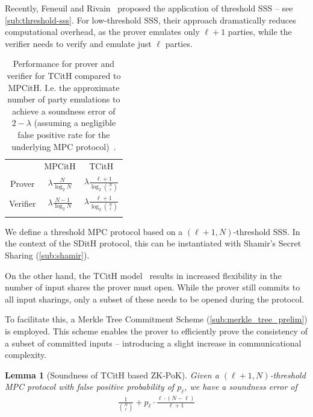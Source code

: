 \documentclass[11pt]{report}
\theoremstyle{definition}
\theoremstyle{plain}
\newtheorem{lemma}{Lemma}[section]
\begin{document}
Recently, Feneuil and Rivain~\cite{feneuil2023threshold,feneuil2023threshold2} proposed the application of threshold SSS -- see \autoref{sub:threshold-sss}. For low-threshold SSS, their approach dramatically reduces computational overhead, as the prover emulates only $\ell + 1$ parties, while the verifier needs to verify and emulate just $\ell$ parties.

\begin{table}[]
  \centering
  \def\arraystretch{1.5}%
  \begin{tabular}{ccc}
    \textbf{} & MPCitH                          & TCitH                                              \\ \arrayrulecolor{darkgray}\hline
    Prover    & $ \lambda \frac{N}{\log_2 N}$   & $ \lambda \frac{\ell + 1}{\log_2 \binom{N}{\ell}}$ \\ \arrayrulecolor{lightgray}\hline
    Verifier  & $ \lambda \frac{N-1}{\log_2 N}$ & $ \lambda \frac{\ell + 1}{\log_2 \binom{N}{\ell}}$ \\ \arrayrulecolor{darkgray}\hline
  \end{tabular}
  \caption{Performance for prover and verifier for TCitH compared to MPCitH. I.e. the approximate number of party emulations to achieve a soundness error of $2-\lambda$ (assuming a negligible false positive rate for the underlying MPC protocol)~\cite{feneuil2023threshold}.}\label{tbl:tcith-performance}
\end{table}

We define a threshold MPC protocol based on a $(\ell + 1, N)$-threshold SSS. In the context of the SDitH protocol, this can be instantiated with Shamir's Secret Sharing (\autoref{sub:shamir}).

On the other hand, the TCitH model~\cite{feneuil2023threshold} results in increased flexibility in the number of input shares the prover must open. While the prover still commits to all input sharings, only a subset of these needs to be opened during the protocol.

To facilitate this, a Merkle Tree Commitment Scheme (\autoref{sub:merkle_tree_prelim}) is employed. This scheme enables the prover to efficiently prove the consistency of a subset of committed inputs -- introducing a slight increase in communicational complexity.

\begin{lemma}[Soundness of TCitH based ZK-PoK]
  Given a $(\ell +1,N)$-threshold MPC protocol with false positive probability of $p_{\ell}$, we have a soundness error of
  \begin{align*}
    \frac{1}{\binom{N}{\ell}} + p_{\ell} \cdot \frac{\ell \cdot (N - \ell)}{\ell + 1}
  \end{align*}
\end{lemma}
\end{document}
